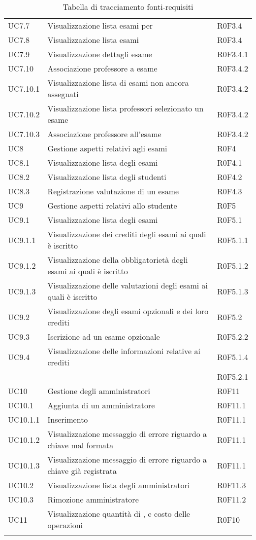 \documentclass[AnalisiDeiRequisiti.tex]{subfiles}
\begin{document}
\begin{longtable}[H]{p{2cm}p{5cm}p{5cm}}
	UC7.7 & Visualizzazione lista esami per \citGloss{corso di laurea} & R0F3.4 \\
	UC7.8 & Visualizzazione lista esami & R0F3.4 \\
	UC7.9 & Visualizzazione dettagli esame & R0F3.4.1 \\
	UC7.10 & Associazione professore a esame & R0F3.4.2 \\
	UC7.10.1 & Visualizzazione lista di esami non ancora assegnati & R0F3.4.2 \\ 
	UC7.10.2 & Visualizzazione lista professori selezionato un esame & R0F3.4.2 \\ 
	UC7.10.3 & Associazione professore all'esame & R0F3.4.2 \\ 
	UC8 & Gestione aspetti relativi agli esami & R0F4 \\
	UC8.1 & Visualizzazione lista degli esami & R0F4.1 \\
	UC8.2 & Visualizzazione lista degli studenti & R0F4.2  \\
	UC8.3 & Registrazione valutazione di un esame & R0F4.3 \\
	UC9 & Gestione aspetti relativi allo studente & R0F5 \\
	UC9.1 & Visualizzazione lista degli esami & R0F5.1 \\
	UC9.1.1 & Visualizzazione dei crediti degli esami ai quali è iscritto & R0F5.1.1 \\
	UC9.1.2 & Visualizzazione della obbligatorietà degli esami ai quali è iscritto & R0F5.1.2 \\
	UC9.1.3 & Visualizzazione delle valutazioni degli esami ai quali è iscritto	& R0F5.1.3 \\
	UC9.2 & Visualizzazione degli esami opzionali e dei loro crediti & R0F5.2 \\
	UC9.3 & Iscrizione ad un esame opzionale & R0F5.2.2 \\
	UC9.4 & Visualizzazione delle informazioni relative ai crediti & R0F5.1.4 \\ 
	& & R0F5.2.1 \\
	UC10 & Gestione degli amministratori & R0F11 \\
	UC10.1 & Aggiunta di un amministratore & R0F11.1 \\
	UC10.1.1 & Inserimento \citGloss{chiave pubblica} & R0F11.1 \\
	UC10.1.2 & Visualizzazione messaggio di errore riguardo a chiave mal formata & R0F11.1 \\
	UC10.1.3 & Visualizzazione messaggio di errore riguardo a chiave già registrata & R0F11.1 \\
	UC10.2 & Visualizzazione lista degli amministratori & R0F11.3 \\
	UC10.3 & Rimozione amministratore & R0F11.2 \\
	UC11 & Visualizzazione quantità di \citGloss{Gas}, \citGloss{Ether} e costo delle operazioni & R0F10 \\
	\hiderowcolors
	\caption{Tabella di tracciamento fonti-requisiti}
\end{longtable}
\end{document}
